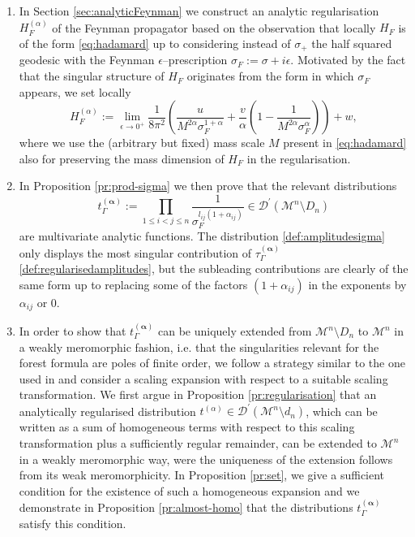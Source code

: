 \documentclass[a4paper,10pt,twoside]{article}
\numberwithin{equation}{section}
\newcounter{and}
\def\M{\mathcal{M}}
\def\D{\mathcal{D}}
\def\balpha{{\boldsymbol{\alpha}}}
\def\beq{\begin{equation}}
\def\eeq{\end{equation}}
\theoremstyle{plain}
\theoremstyle{definition}
\begin{document}
\begin{enumerate}
\item In Section \ref{sec:analyticFeynman} we construct an analytic regularisation $H^{(\alpha)}_F$ of the Feynman propagator based on the observation that locally $H_F$ is of the form \eqref{eq:hadamard} up to considering instead of $\sigma_+$ the half squared geodesic with the Feynman $\epsilon$--prescription $\sigma_F := \sigma + i\epsilon$. Motivated by the fact that the singular structure of $H_F$ originates from the form in which $\sigma_F$ appears, we set locally
%
\begin{equation}\label{eq:anal-feynman}
H^{(\alpha)}_F := \lim_{\epsilon\to 0^+} \frac{1}{8\pi^2}\left(\frac{u}{M^{2\alpha}\sigma_F^{1+\alpha}} + \frac{v}{\alpha} \left(1-\frac{1}{M^{2\alpha}\sigma_F^{\alpha}}\right)\right)+w,
\end{equation}
%
where we use the (arbitrary but fixed) mass scale $M$ present in \eqref{eq:hadamard} also for preserving the mass dimension of $H_F$ in the regularisation.
\item In Proposition \ref{pr:prod-sigma} we then prove that the relevant distributions
%
\beq\label{def:amplitudesigma}t_\Gamma^{(\balpha)} := \prod_{1\le i<j\le n} \frac{1}{\sigma_F^{l_{ij}(1+\alpha_{ij})}}\in \D^\prime(\M^n\setminus D_n)\eeq
%
are multivariate analytic functions. The distribution \eqref{def:amplitudesigma} only displays the most singular contribution of $\tau^{(\balpha)}_\Gamma$ \eqref{def:regularisedamplitudes}, but the subleading contributions are clearly of the same form up to replacing some of the factors $(1+\alpha_{ij})$ in the exponents by $\alpha_{ij}$ or 0.
\item In order to show that $t_\Gamma^{(\balpha)}$ can be uniquely extended from $\M^n\setminus D_n$ to $\M^n$ in a weakly meromorphic fashion, i.e. that the singularities relevant for the forest formula are poles of finite order, we follow a strategy similar to the one used in \cite{Hollands:2001b} and consider a scaling expansion with respect to a suitable scaling transformation. We first argue in Proposition \ref{pr:regularisation} that an analytically regularised distribution $t^{(\alpha)}\in\D^\prime(\M^n\setminus d_n)$, which can be written as a sum of homogeneous terms with respect to this scaling transformation plus a sufficiently regular remainder, can be extended to $\M^n$ in a weakly meromorphic way, were the uniqueness of the extension follows from its weak meromorphicity. In Proposition \ref{pr:set}, we give a sufficient condition for the existence of such a homogeneous expansion and we demonstrate in Proposition \ref{pr:almost-homo} that the distributions $t_\Gamma^{(\balpha)}$ satisfy this condition.


\end{enumerate}
\end{document}
